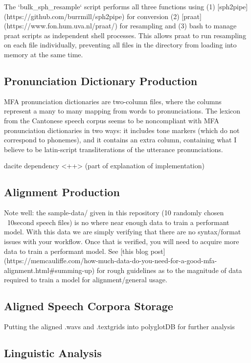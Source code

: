 \documentclass[twoside,11pt]{article}
\begin{document}
The `bulk_sph_resample` script performs all three functions using (1) [sph2pipe](https://github.com/burrmill/sph2pipe) for conversion (2) [praat](https://www.fon.hum.uva.nl/praat/) for resampling and (3) bash to manage praat scripts as independent shell processes. This allows praat to run resampling on each file individually, preventing all files in the directory from loading into memory at the same time.

\subsection{Pronunciation Dictionary Production}

MFA pronunciation dictionaries are two-column files, where the columns represent a many to many mapping from words to pronunciations. The lexicon from the Cantonese speech corpus seems to be noncompliant with MFA pronunciation dictionaries in two ways: it includes tone markers (which do not correspond to phonemes), and it contains an extra column, containing what I believe to be latin-script transliterations of the utterance pronunciations.

dacite dependency <++> (part of explanation of implementation)

\subsection{Alignment Production}

Note well: the sample-data/ given in this repository (10 randomly chosen ~10second speech files) is no where near enough data to train a performant model. With this data we are simply verifying that there are no syntax/format issues with your workflow. Once that is verified, you will need to acquire more data to train a performant model. See [this blog post](https://memcauliffe.com/how-much-data-do-you-need-for-a-good-mfa-alignment.html#summing-up) for rough guidelines as to the magnitude of data required to train a model for alignment/general usage.


\subsection{Aligned Speech Corpora Storage}

Putting the aligned .wavs and .textgrids into polyglotDB for further analysis

\subsection{Linguistic Analysis}
\end{document}
